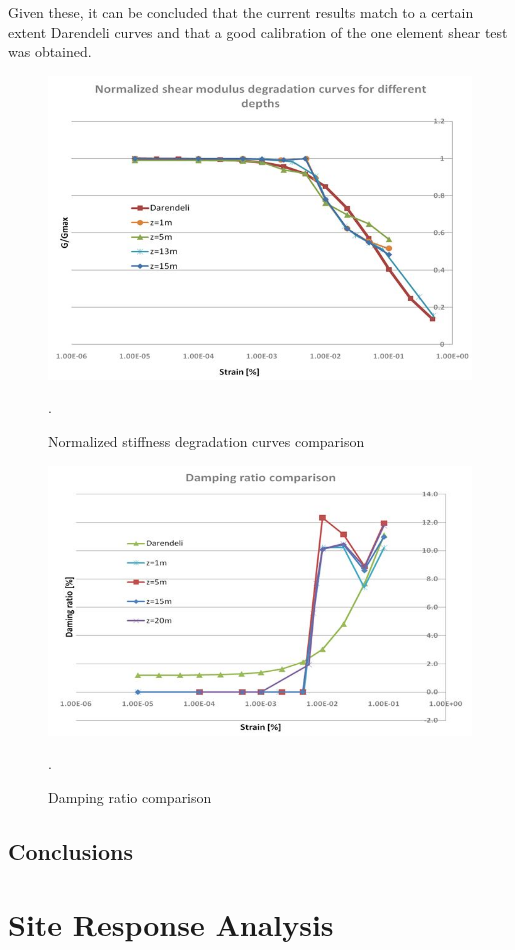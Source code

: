 \documentclass[10pt,a4paper]{report}
\begin{document}
Given these, it can be concluded that the current results match to a certain extent Darendeli curves and that a good calibration of the one element shear test was obtained.

\begin{figure}[h!]
	\centering
	\includegraphics[width=0.75\linewidth]{"ggmax2"}
	\caption{Normalized stiffness degradation curves comparison}
	\label{ggmax2}.
\end{figure}

\begin{figure}[h!]
	\centering
	\includegraphics[width=0.7\linewidth]{"dampiing"}
	\caption{Damping ratio comparison}
	\label{damping}.
\end{figure}

\section{Conclusions}

	\chapter {Site Response Analysis}
\end{document}
